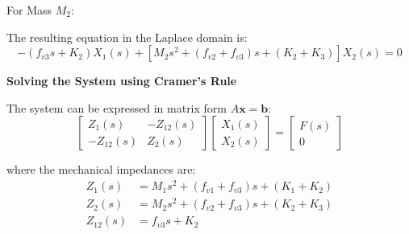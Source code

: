 \documentclass[11pt]{article}
\begin{document}
\vspace{12pt}
{For Mass $M_2$:}
\begin{figure}[h!]
\centering
{}
\end{figure}

The resulting equation in the Laplace domain is:
\begin{equation}
-(f_{v3}s + K_2)X_1(s) + [M_2s^2 + (f_{v2} + f_{v3})s + (K_2 + K_3)]X_2(s) = 0 \tag{2}
\end{equation}

\newpage
\noindent\textbf{Solving the System using Cramer's Rule}
\vspace{12pt}

The system can be expressed in matrix form $A\mathbf{x} = \mathbf{b}$:
$$
\begin{bmatrix}
Z_{1}(s) & -Z_{12}(s) \\
-Z_{12}(s) & Z_{2}(s)
\end{bmatrix}
\begin{bmatrix}
X_1(s) \\
X_2(s)
\end{bmatrix}
=
\begin{bmatrix}
F(s) \\
0
\end{bmatrix}
$$

where the mechanical impedances are:
\begin{align*}
    Z_{1}(s) &= M_1s^2 + (f_{v1} + f_{v3})s + (K_1 + K_2) \\
    Z_{2}(s) &= M_2s^2 + (f_{v2} + f_{v3})s + (K_2 + K_3) \\
    Z_{12}(s) &= f_{v3}s + K_2
\end{align*}
\end{document}
